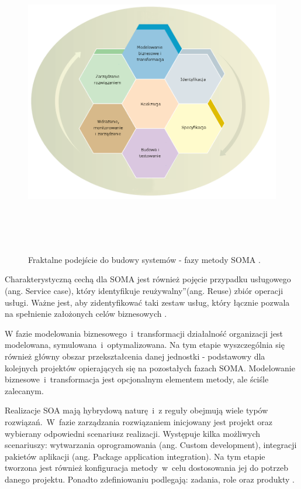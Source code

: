 \begin{figure}[h!tbp]
\begin{centering}
\includegraphics[width=16cm, height=13.5cm]{img/soma_fractal_lifecycle.png}
\caption[Fraktalne podejście do budowy systemów - fazy metody SOMA.]{Fraktalne podejście do budowy systemów - fazy metody SOMA \cite{SOMAArsIBMJour}.}\label{soma_fractal_lifecycle}
\end{centering}
\end{figure}

Charakterystyczną cechą dla SOMA jest również pojęcie przypadku usługowego (ang. Service case), który identyfikuje \quotedblbase reużywalny\textquotedblright (ang. Reuse) zbiór operacji usługi. Ważne jest, aby zidentyfikować taki zestaw usług, który łącznie pozwala na spełnienie założonych celów biznesowych \cite{PlatIntGor}.

W fazie modelowania biznesowego~i~transformacji działalność organizacji jest modelowana, symulowana~i~optymalizowana. Na tym etapie wyszczególnia się również główny obszar przekształcenia danej jednostki - podstawowy dla kolejnych projektów opierających się na pozostałych fazach SOMA. Modelowanie biznesowe~i~transformacja jest opcjonalnym elementem metody, ale ściśle zalecanym. 

Realizacje SOA mają hybrydową naturę~i~z reguły obejmują wiele typów rozwiązań.~W~fazie zarządzania rozwiązaniem inicjowany jest projekt oraz wybierany odpowiedni scenariusz realizacji. Występuje kilka możliwych scenariuszy: wytwarzania oprogramowania (ang. Custom development), integracji pakietów aplikacji (ang. Package application integration). Na tym etapie tworzona jest również konfiguracja metody~w~celu dostosowania jej do potrzeb danego projektu. Ponadto zdefiniowaniu podlegają: zadania, role oraz produkty \cite{SOMAArsIBMJour}.

